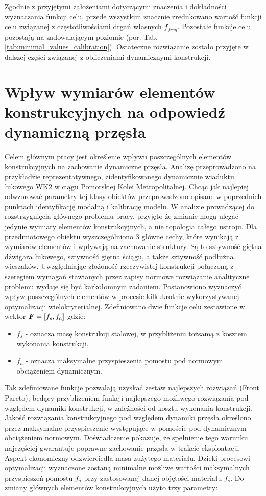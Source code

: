 Zgodnie z przyjętymi założeniami dotyczącymi znaczenia i dokładności wyznaczania funkcji celu, przede wszystkim znacznie zredukowano wartość funkcji celu związanej z częstotliwościami drgań własnych $f_{freq}$. Pozostałe funkcje celu pozostają na zadowalającym poziomie (por. Tab. \ref{tab:minimal_values_calibration}). Ostateczne rozwiązanie zostało przyjęte w dalszej części związanej z obliczeniami dynamicznymi konstrukcji.

\pagebreak[4]

\section{Wpływ wymiarów elementów konstrukcyjnych na odpowiedź dynamiczną przęsła}
Celem głównym pracy jest określenie wpływu poszczególnych elementów konstrukcyjnych na zachowanie dynamiczne przęsła. Analizę przeprowadzono na przykładzie reprezentatywnego, zidentyfikowanego dynamicznie wiaduktu łukowego WK2 w ciągu Pomorskiej Kolei Metropolitalnej. Chcąc jak najlepiej odwzorować parametry tej klasy obiektów przeprowadzono opisane w poprzednich punktach identyfikację modalną i kalibrację modelu. W analizie prowadzącej do rozstrzygnięcia głównego problemu pracy, przyjęto że zmianie mogą ulegać jedynie wymiary elementów konstrukcyjnych, a nie topologia całego ustroju. Dla przedmiotowego obiektu wyszczególniono 3 główne cechy, które wynikają z wymiarów elementów i wpływają na zachowanie struktury. Są to sztywność giętna dźwigara łukowego, sztywność giętna ściągu, a także sztywność podłużna wieszaków. Uwzględniając złożoność rzeczywistej konstrukcji połączoną z szeregiem wymagań stawianych przez zapisy normowe rozwiązanie analityczne problemu wydaje się być karkołomnym zadaniem. Postanowiono wyznaczyć wpływ poszczególnych elementów w procesie kilkukrotnie wykorzystywanej optymalizacji wielokryterialnej. Zdefiniowano dwie funkcje celu zestawione w wektor $\bm{F}=[f_s,f_a]$ gdzie:
\begin{itemize}
	\item $f_s$ - oznacza masę konstrukcji stalowej, w przybliżeniu tożsamą z kosztem wykonania konstrukcji,
	\item $f_a$ - oznacza maksymalne przyspieszenia pomostu pod normowym obciążeniem dynamicznym.
\end{itemize}
Tak zdefiniowane funkcje pozwalają uzyskać zestaw najlepszych rozwiązań (Front Pareto), będący przybliżeniem funkcji najlepszego możliwego rozwiązania pod względem dynamiki konstrukcji, w zależności od kosztu wykonania konstrukcji. Jakość rozwiązania konstrukcyjnego pod względem dynamiki przęsła określono przez maksymalne przyspieszenie występujące w pomoście pod dynamicznym obciążeniem normowym. Doświadczenie pokazuje, że spełnienie tego warunku najczęściej gwarantuje poprawne zachowanie przęsła w trakcie eksploatacji. Aspekt ekonomiczny odzwierciedla masa zużytego materiału. Dzięki procesowi optymalizacji wyznaczone zostaną minimalne możliwe wartości maksymalnych przyspieszeń pomostu $f_a$ przy zastosowanej danej objętości materiału $f_s$. Do zmiany głównych elementów konstrukcyjnych użyto trzy parametry:
